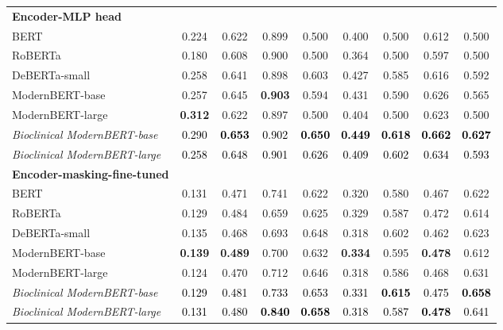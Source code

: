 \begin{table}[htbp]
\begin{ChSevenFloatBody}
{\begin{tabular}{lcccccccc}
\midrule
\textbf{Encoder-MLP head} &&&&&&&&\\
BERT & 0.224 & 0.622 & 0.899 & 0.500 & 0.400 & 0.500 & 0.612 & 0.500 \\
RoBERTa & 0.180 & 0.608 & 0.900 & 0.500 & 0.364 & 0.500 & 0.597 & 0.500 \\
DeBERTa-small & 0.258 & 0.641 & 0.898 & 0.603 & 0.427 & 0.585 & 0.616 & 0.592 \\
ModernBERT-base & 0.257 & 0.645 & \textbf{0.903} & 0.594 & 0.431 & 0.590 & 0.626 & 0.565 \\
ModernBERT-large & \textbf{0.312} & 0.622 & 0.897 & 0.500 & 0.404 & 0.500 & 0.623 & 0.500 \\
\textit{Bioclinical ModernBERT-base} & \textcolor{black}{0.290} & \textcolor{black}{\textbf{0.653}} & \textcolor{black}{0.902} & \textcolor{black}{\textbf{0.650}} & \textcolor{black}{\textbf{0.449}} & \textcolor{black}{\textbf{0.618}} & \textcolor{black}{\textbf{0.662}} & \textcolor{black}{\textbf{0.627}} \\
\textit{Bioclinical ModernBERT-large} & \textcolor{black}{0.258} & \textcolor{black}{0.648} & \textcolor{black}{0.901} & \textcolor{black}{0.626} & \textcolor{black}{0.409} & \textcolor{black}{0.602} & \textcolor{black}{0.634} & \textcolor{black}{0.593} \\
\midrule
\textbf{Encoder-masking-fine-tuned} &&&&&&&&\\
BERT & 0.131 & 0.471 & 0.741 & 0.622 & 0.320 & 0.580 & 0.467 & 0.622 \\
RoBERTa & 0.129 & 0.484 & 0.659 & 0.625 & 0.329 & 0.587 & 0.472 & 0.614 \\
DeBERTa-small & 0.135 & 0.468 & 0.693 & 0.648 & 0.318 & 0.602 & 0.462 & 0.623 \\
ModernBERT-base & \textbf{0.139} & \textbf{0.489} & 0.700 & 0.632 & \textbf{0.334} & 0.595 & \textbf{0.478} & 0.612 \\
ModernBERT-large & 0.124 & 0.470 & 0.712 & 0.646 & 0.318 & 0.586 & 0.468 & 0.631 \\
\textit{Bioclinical ModernBERT-base} & \textcolor{black}{0.129} & \textcolor{black}{0.481} & \textcolor{black}{0.733} & \textcolor{black}{0.653} & \textcolor{black}{0.331} & \textcolor{black}{\textbf{0.615}} & \textcolor{black}{0.475} & \textcolor{black}{\textbf{0.658}} \\
\textit{Bioclinical ModernBERT-large} & \textcolor{black}{0.131} & \textcolor{black}{0.480} & \textcolor{black}{\textbf{0.840}} & \textcolor{black}{\textbf{0.658}} & \textcolor{black}{0.318} & \textcolor{black}{0.587} & \textcolor{black}{\textbf{0.478}} & \textcolor{black}{0.641} \\

\end{tabular}}
\end{ChSevenFloatBody}
\end{table}
